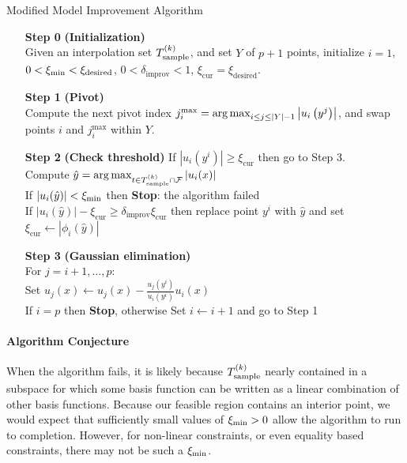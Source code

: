 \begin{algorithm}[H]
    \caption{Modified Model Improvement Algorithm}
    \label{modified_model_improving_algorithm}
    \begin{itemize}
        \item[\textbf{Step 0}] \textbf{(Initialization)} \\
            Given an interpolation set ${T_{\text{sample}}^{(k)}}$, and set $Y$ of $p+1$ points,
            initialize $i=1$, $0 < \xi_{\text{min}} < \xi_{\text{desired}}$, $0 <\delta_{\text{improv}} < 1$,
            $  \xi_{\text{cur}} = \xi_{\text{desired}}$.
            
		\item[\textbf{Step 1}] \textbf{(Pivot)} \\
			Compute the next pivot index $j^{\textrm{max}}_i = \operatorname*{arg\,max}_{i \le j \le |Y|-1} \left|u_i\left(y^j\right)\right|$,
			and swap points $i$ and $j^{\textrm{max}}_i$ within $Y$.
			
        \item[\textbf{Step 2}] \textbf{(Check threshold)}
                If $\left|u_i\left(y^i\right)\right| \ge \xi_{\text{cur}}$ then go to Step 3. \\
                Compute $ \hat y = \arg\max_{t \in {T_{\text{sample}}^{(k)}} \cap {\mathcal F}}\left|u_i(x)\right|$ \\
                If $ |u_i(\hat y)| < \xi_{\text{min}}$ then \textbf{Stop}: the algorithm failed \\
                If $|u_i(\hat y)| - \xi_{\text{cur}} \ge \delta_{\text{improv}} \xi_{\text{cur}}$ then
                replace point $y^i$ with $\hat y$ and set $\xi_{\text{cur}} \gets |\phi_i(\hat y)|$
                
        \item[\textbf{Step 3}] \textbf{(Gaussian elimination)} \\
        	For $j = i+1, \ldots, p$: \\
        	Set $u_j(x) \gets u_j(x) - \frac{u_j\left(y^i\right)}{u_i\left(y^i\right)} u_i(x)$ \\
            If $i = p$ then \textbf{Stop}, otherwise Set $i \gets i+1$ and go to Step 1
    \end{itemize}
\end{algorithm}

\paragraph*{Algorithm Conjecture}

When the algorithm fails, it is likely because ${T_{\text{sample}}^{(k)}}$ nearly contained in a subspace 
for which some basis function can be written as a linear combination of other basis functions.
Because our feasible region contains an interior point, we would expect that sufficiently small values of $\xi_{\text{min}}>0$ allow the algorithm to run to completion.
However, for non-linear constraints, or even equality based constraints, there may not be such a $\xi_{\text{min}}$.

